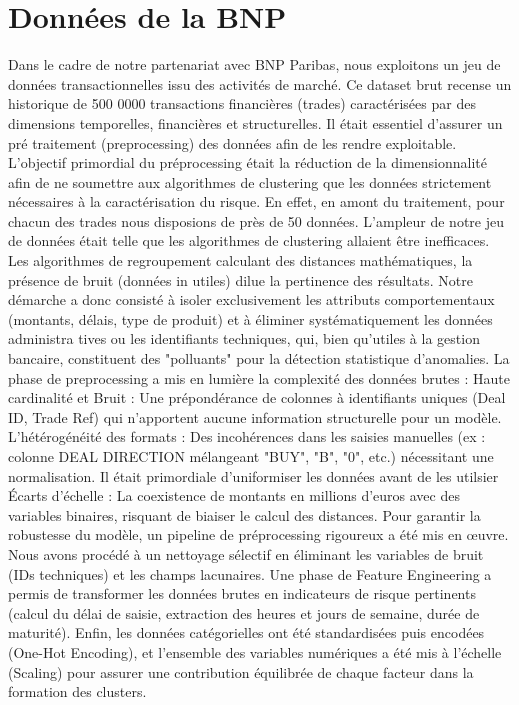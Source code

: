 \documentclass[a4paper]{article}
\begin{document}
\section{Données de la BNP}\label{sec:bnp}

Dans le cadre de notre partenariat avec BNP Paribas, nous exploitons un jeu de données transactionnelles
issu des activités de marché. Ce dataset brut recense un historique de 500 0000 transactions financières (trades)
caractérisées par des dimensions temporelles, financières et structurelles. Il était essentiel d’assurer un pré
traitement (preprocessing) des données afin de les rendre exploitable. L’objectif primordial du préprocessing
était la réduction de la dimensionnalité afin de ne soumettre aux algorithmes de clustering que les données
strictement nécessaires à la caractérisation du risque. En effet, en amont du traitement, pour chacun des trades
nous disposions de près de 50 données. L’ampleur de notre jeu de données était telle que les algorithmes de
clustering allaient être inefficaces.
Les algorithmes de regroupement calculant des distances mathématiques, la présence de bruit (données in
utiles) dilue la pertinence des résultats. Notre démarche a donc consisté à isoler exclusivement les attributs
comportementaux (montants, délais, type de produit) et à éliminer systématiquement les données administra
tives ou les identifiants techniques, qui, bien qu’utiles à la gestion bancaire, constituent des "polluants" pour la
détection statistique d’anomalies.
La phase de preprocessing a mis en lumière la complexité des données brutes :
Haute cardinalité et Bruit : Une prépondérance de colonnes à identifiants uniques (Deal ID, Trade Ref) qui
n’apportent aucune information structurelle pour un modèle.
L’hétérogénéité des formats : Des incohérences dans les saisies manuelles (ex : colonne DEAL DIRECTION
mélangeant "BUY", "B", "0", etc.) nécessitant une normalisation. Il était primordiale d’uniformiser les données
avant de les utilsier
Écarts d’échelle : La coexistence de montants en millions d’euros avec des variables binaires, risquant de
biaiser le calcul des distances.
Pour garantir la robustesse du modèle, un pipeline de préprocessing rigoureux a été mis en œuvre. Nous avons
procédé à un nettoyage sélectif en éliminant les variables de bruit (IDs techniques) et les champs lacunaires. Une
phase de Feature Engineering a permis de transformer les données brutes en indicateurs de risque pertinents
(calcul du délai de saisie, extraction des heures et jours de semaine, durée de maturité). Enfin, les données
catégorielles ont été standardisées puis encodées (One-Hot Encoding), et l’ensemble des variables numériques a
été mis à l’échelle (Scaling) pour assurer une contribution équilibrée de chaque facteur dans la formation des
clusters.
\end{document}

